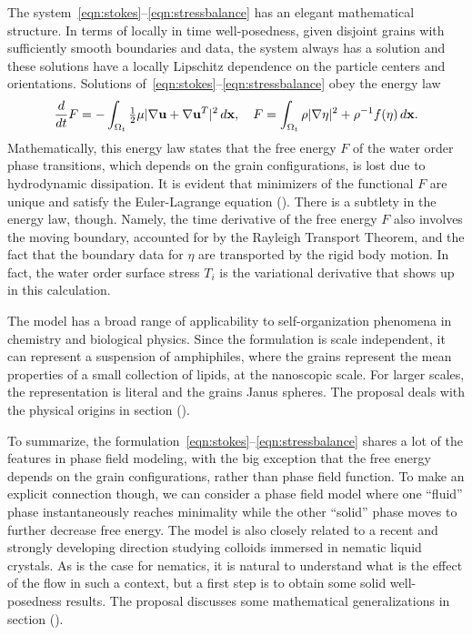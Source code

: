 The system~\eqref{eqn:stokes}--\eqref{eqn:stressbalance} has an elegant
mathematical structure. In terms of locally in time well-posedness,
given disjoint grains with sufficiently smooth boundaries and data, the
system always has a solution and these solutions have a locally
Lipschitz dependence on the particle centers and orientations.
Solutions of~\eqref{eqn:stokes}--\eqref{eqn:stressbalance} obey the
energy law
\begin{equation}
  \frac{d}{dt}F
  = - \int_{\Omega_t} \tfrac{1}{2}\mu|\nabla \mathbf{u} + \nabla \mathbf{u}^T|^2 \,d\mathbf{x},
  \quad
  F = \int_{\Omega_t}
  \rho |\nabla \eta|^2 + \rho^{-1} f(\eta) \,d\mathbf{x}.
\end{equation}
Mathematically, this energy law states that the free energy $F$ of the
water order phase transitions, which depends on the grain
configurations, is lost due to hydrodynamic dissipation. It is evident
that minimizers of the functional $F$ are unique and satisfy the
Euler-Lagrange equation (). There is a subtlety in the energy law,
though. Namely, the time derivative of the free energy $F$ also involves
the moving boundary, accounted for by the Rayleigh Transport Theorem,
and the fact that the boundary data for $\eta$ are transported by the
rigid body motion. In fact, the water order surface stress $T_i$ is the
variational derivative that shows up in this calculation.

The model has a broad range of applicability to self-organization
phenomena in chemistry and biological physics. Since the formulation is
scale independent, it can represent a suspension of amphiphiles, where
the grains represent the mean properties of a small collection of
lipids, at the nanoscopic scale.  For larger scales, the representation
is literal and the grains Janus spheres.  The proposal deals with the
physical origins in section (). 

To summarize, the
formulation~\eqref{eqn:stokes}--\eqref{eqn:stressbalance} shares a lot
of the features in phase field modeling, with the big exception that the
free energy depends on the grain configurations, rather than phase field
function. To make an explicit connection though, we can consider a phase
field model where one ``fluid'' phase instantaneously reaches minimality
while the other ``solid'' phase moves to further decrease free energy.
The model is also closely related to a recent and strongly developing
direction studying colloids immersed in nematic liquid crystals. As is
the case for nematics, it is natural to understand what is the effect of
the flow in such a context, but a first step is to obtain some solid
well-posedness results. The proposal discusses some mathematical
generalizations in section ().

